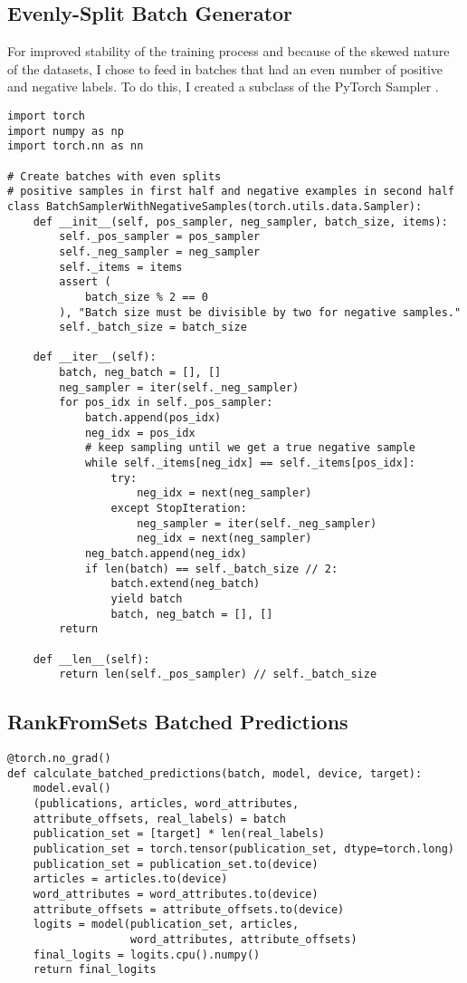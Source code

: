 \subsection{Evenly-Split Batch Generator}
For improved stability of the training process and because of the skewed nature of the datasets, I chose to feed in batches that had an even number of positive and negative labels. To do this, I created a subclass of the PyTorch Sampler \parencite{NEURIPS2019_9015}.
\begin{verbatim}
import torch
import numpy as np
import torch.nn as nn

# Create batches with even splits
# positive samples in first half and negative examples in second half
class BatchSamplerWithNegativeSamples(torch.utils.data.Sampler):
    def __init__(self, pos_sampler, neg_sampler, batch_size, items):
        self._pos_sampler = pos_sampler
        self._neg_sampler = neg_sampler
        self._items = items
        assert (
            batch_size % 2 == 0
        ), "Batch size must be divisible by two for negative samples."
        self._batch_size = batch_size

    def __iter__(self):
        batch, neg_batch = [], []
        neg_sampler = iter(self._neg_sampler)
        for pos_idx in self._pos_sampler:
            batch.append(pos_idx)
            neg_idx = pos_idx
            # keep sampling until we get a true negative sample
            while self._items[neg_idx] == self._items[pos_idx]:
                try:
                    neg_idx = next(neg_sampler)
                except StopIteration:
                    neg_sampler = iter(self._neg_sampler)
                    neg_idx = next(neg_sampler)
            neg_batch.append(neg_idx)
            if len(batch) == self._batch_size // 2:
                batch.extend(neg_batch)
                yield batch
                batch, neg_batch = [], []
        return

    def __len__(self):
        return len(self._pos_sampler) // self._batch_size

\end{verbatim}

\subsection{RankFromSets Batched Predictions}
\begin{verbatim}
@torch.no_grad()
def calculate_batched_predictions(batch, model, device, target):
    model.eval()
    (publications, articles, word_attributes, 
    attribute_offsets, real_labels) = batch
    publication_set = [target] * len(real_labels)
    publication_set = torch.tensor(publication_set, dtype=torch.long)
    publication_set = publication_set.to(device)
    articles = articles.to(device)
    word_attributes = word_attributes.to(device)
    attribute_offsets = attribute_offsets.to(device)
    logits = model(publication_set, articles, 
    			   word_attributes, attribute_offsets)
    final_logits = logits.cpu().numpy()
    return final_logits
\end{verbatim}

